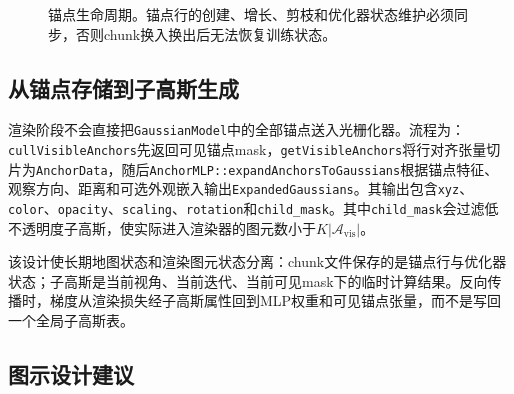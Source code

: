 \begin{figure}[htbp]
\centering
{}
\caption{锚点生命周期。锚点行的创建、增长、剪枝和优化器状态维护必须同步，否则chunk换入换出后无法恢复训练状态。}
\label{fig:anchor_lifecycle}
\end{figure}

\subsection{从锚点存储到子高斯生成}

渲染阶段不会直接把\texttt{GaussianModel}中的全部锚点送入光栅化器。流程为：\texttt{cullVisibleAnchors}先返回可见锚点mask，\texttt{getVisibleAnchors}将行对齐张量切片为\texttt{AnchorData}，随后\texttt{AnchorMLP::expandAnchorsToGaussians}根据锚点特征、观察方向、距离和可选外观嵌入输出\texttt{ExpandedGaussians}。其输出包含\texttt{xyz}、\texttt{color}、\texttt{opacity}、\texttt{scaling}、\texttt{rotation}和\texttt{child\_mask}。其中\texttt{child\_mask}会过滤低不透明度子高斯，使实际进入渲染器的图元数小于$K|\mathcal{A}_{\mathrm{vis}}|$。

该设计使长期地图状态和渲染图元状态分离：chunk文件保存的是锚点行与优化器状态；子高斯是当前视角、当前迭代、当前可见mask下的临时计算结果。反向传播时，梯度从渲染损失经子高斯属性回到MLP权重和可见锚点张量，而不是写回一个全局子高斯表。

\subsection{图示设计建议}

